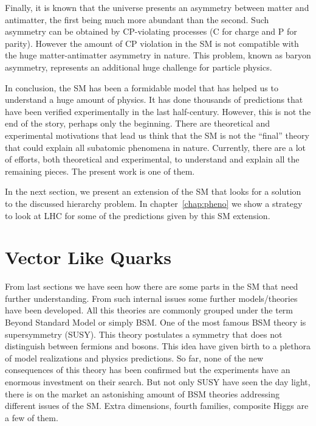 Finally, it is known that the universe presents an asymmetry between matter and antimatter, the first being much more abundant than the second. Such asymmetry can be obtained by CP-violating processes (C for charge and P for parity). However the amount of CP violation in the SM is not compatible with the huge matter-antimatter asymmetry in nature. This problem, known as baryon asymmetry, represents an additional huge challenge for particle physics. 

In conclusion, the SM has been a formidable model that has helped us to understand a huge amount of physics. It has done thousands of predictions that have been verified experimentally in the last half-century. However, this is not the end of the story, perhaps only the beginning. There are theoretical and experimental motivations that lead us think that the SM is not the ``final'' theory that could explain all subatomic phenomena in nature. Currently, there are a lot of efforts, both theoretical and experimental, to understand and explain all the remaining pieces. The present work is one of them.

In the next section, we present an extension of the SM that looks for a solution to the discussed hierarchy problem. In chapter~\ref{chap:pheno} we show a strategy to look at LHC for some of the predictions given by this SM extension.  %

\section{Vector Like Quarks}

\label{chap:VLQ}

From last sections we have seen how there are some parts in the SM that need further understanding. From such internal issues some further models/theories have been developed. All this theories are commonly grouped under the term Beyond Standard Model or simply BSM. One of the most famous BSM theory is supersymmetry (SUSY). This theory postulates a symmetry that does not distinguish between fermions and bosons. This idea have given birth to a plethora of model realizations and physics predictions. So far, none of the new consequences of this theory has been confirmed but the experiments have an enormous investment on their search. But not only SUSY have seen the day light, there is on the market an astonishing amount of BSM theories addressing different issues of the SM. Extra dimensions, fourth families, composite Higgs are a few of them.

